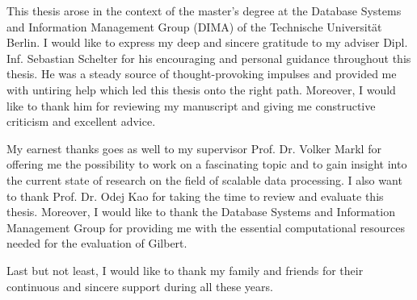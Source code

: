 \clearemptydoublepage
{}
{}	



\vspace*{2cm}

\begin{center}
\end{center}

\vspace{1cm}

This thesis arose in the context of the master’s degree at the Database Systems and Information Management Group (DIMA) of the Technische Universität Berlin. 
I would like to express my deep and sincere gratitude to my adviser Dipl. Inf. Sebastian Schelter for his encouraging and personal guidance throughout this thesis. 
He was a steady source of thought-provoking impulses and provided me with untiring help which led this thesis onto the right path. 
Moreover, I would like to thank him for reviewing my manuscript and giving me constructive criticism and excellent advice.

My earnest thanks goes as well to my supervisor Prof. Dr. Volker Markl for offering me the possibility to work on a fascinating topic and to gain insight into the current state of research on the field of scalable data processing.
I also want to thank Prof. Dr. Odej Kao for taking the time to review and evaluate this thesis.
Moreover, I would like to thank the Database Systems and Information Management Group for providing me with the essential computational resources needed for the evaluation of Gilbert.

Last but not least, I would like to thank my family and friends for their continuous and sincere support during all these years.